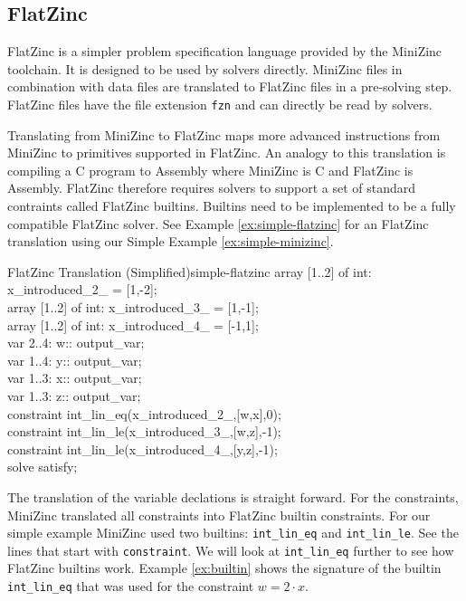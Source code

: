 \subsection{FlatZinc}

FlatZinc is a simpler problem specification language provided by the MiniZinc toolchain. It is designed to be used by solvers directly. MiniZinc files in combination with data files are translated to FlatZinc files in a pre-solving step. FlatZinc files have the file extension \verb|fzn| and can directly be read by solvers.

Translating from MiniZinc to FlatZinc maps more advanced instructions from MiniZinc to primitives supported in FlatZinc. An analogy to this translation is compiling a C program to Assembly where MiniZinc is C and FlatZinc is Assembly. FlatZinc therefore requires solvers to support a set of standard contraints called FlatZinc builtins. Builtins need to be implemented to be a fully compatible FlatZinc solver. See Example \ref{ex:simple-flatzinc} for an FlatZinc translation using our Simple Example \ref{ex:simple-minizinc}.

\begin{example}{FlatZinc Translation (Simplified)}{simple-flatzinc}
	array [1..2] of int: x\_introduced\_2\_ = [1,-2]; \\
	array [1..2] of int: x\_introduced\_3\_ = [1,-1]; \\
	array [1..2] of int: x\_introduced\_4\_ = [-1,1]; \\
	var 2..4: w:: output\_var; \\
	var 1..4: y:: output\_var; \\
	var 1..3: x:: output\_var; \\
	var 1..3: z:: output\_var; \\
	constraint int\_lin\_eq(x\_introduced\_2\_,[w,x],0); \\
	constraint int\_lin\_le(x\_introduced\_3\_,[w,z],-1); \\
	constraint int\_lin\_le(x\_introduced\_4\_,[y,z],-1); \\
	solve  satisfy;
\end{example}

The translation of the variable declations is straight forward. For the constraints, MiniZinc translated all constraints into FlatZinc builtin constraints. For our simple example MiniZinc used two builtins: \verb|int_lin_eq| and \verb|int_lin_le|. See the lines that start with \verb|constraint|. We will look at \verb|int_lin_eq| further to see how FlatZinc builtins work. Example \ref{ex:builtin} shows the signature of the builtin \verb|int_lin_eq| that was used for the constraint $w = 2 \cdot x$. \\

